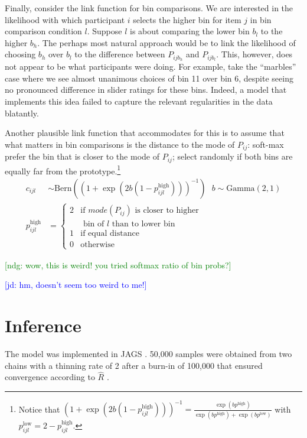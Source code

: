 \documentclass[10pt,letterpaper]{article}
\newcommand{\ndg}[1]{\textcolor{Green}{[ndg: #1]}}
\newcommand{\jd}[1]{\textcolor{Blue}{[jd: #1]}}
\begin{document}
Finally, consider the link function for bin comparisons. We are interested in the likelihood with which
participant $i$ selects the higher bin for item $j$ in bin comparison condition $l$. Suppose $l$ is
about comparing the lower bin $b_l$ to the higher $b_h$. The perhaps most natural approach
would be to link the likelihood of choosing $b_h$ over $b_l$ to the difference between
$P_{ijb_h}$ and $P_{ijb_l}$. This, however, does not appear to be what participants were doing. For
example, take the ``marbles'' case where we see almost unanimous choices of bin 11 over bin 6,
despite seeing no pronounced difference in slider ratings for these bins. Indeed, a model that
implements this idea failed to capture the relevant regularities in the data blatantly.

Another plausible link function that accommodates for this is to assume that what matters in
bin comparisons is the distance to the mode of $P_{ij}$: soft-max prefer the bin that is closer
to the mode of $P_{ij}$; select randomly if both bins are equally far from the
prototype.\footnote{Notice that
  $(1 + \exp(2b(1-p^{\text{high}}_{ijl})) )^{-1} = \frac{\exp(b p^{\text{high}})}{\exp(b
    p^{\text{high}}) + \exp(b p^{\text{low}})}$
  with $p^\text{low}_{ijl} = 2 - p^\text{high}_{ijl}$.}
\begin{align*}
  c_{ijl} & \sim \text{Bern}( (1 + \exp(2b(1-p^{\text{high}}_{ijl})) )^{-1} ) \ \ \ 
  b  \sim \text{Gamma}(2,1) \\
  p^\text{high}_{ijl} & = \begin{cases}
    2 & \text{if $mode(P_{ij})$ is closer to higher} \\
    & \text{ bin of $l$ than to lower bin } \\ 1 & \text{if equal
      distance} \\ 0 & \text{otherwise}  
  \end{cases}
\end{align*}

\ndg{wow, this is weird! you tried softmax ratio of bin probs?}

\jd{hm, doesn't seem too weird to me!}

\section{Inference}

The model was implemented in JAGS \cite{Plummer2003:JAGS:-A-Program}. 50,000 samples were
obtained from two chains with a thinning rate of 2 after a burn-in of 100,000 that ensured
convergence according to $\hat{R}$ \cite{GelmanRubin1992:Inference-from-}.
\end{document}
